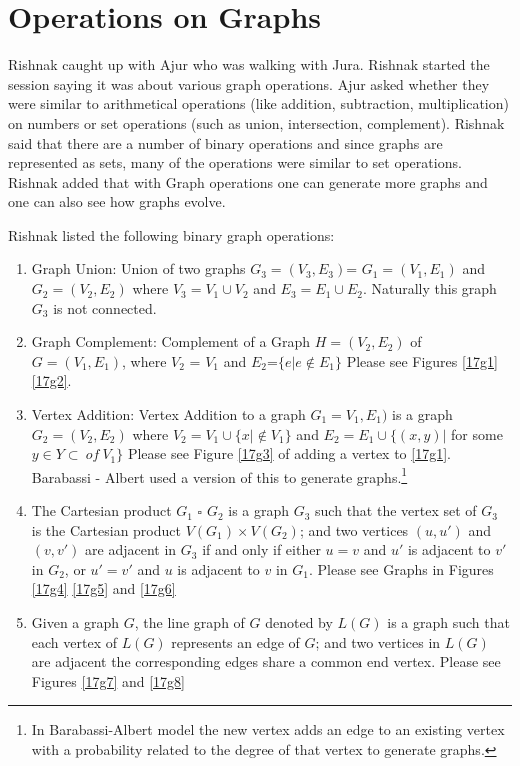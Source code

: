 \chapter{Operations on Graphs}

Rishnak caught up with Ajur who was walking with Jura. Rishnak started the session saying it was about various graph operations.
Ajur asked whether they were similar to arithmetical operations (like addition, subtraction, multiplication) on numbers or set operations (such as union, intersection, complement). Rishnak said that there are a number of binary operations and since graphs are represented as sets, many of the operations were similar to set operations. Rishnak added that with Graph operations one can generate more graphs and one can also see how graphs evolve.

Rishnak listed the following binary graph operations:
\begin{enumerate}
    \item Graph Union: Union of two graphs $G_3=(V_3,E_3)$= $G_1=(V_1,E_1)$ and $G_2=(V_2,E_2)$ where $V_3= V_1 \cup V_2$ and
    $E_3=E_1\cup E_2$. Naturally this graph $G_3$ is not connected.
    \item Graph Complement: Complement of a Graph $H=(V_2,E_2)$ of $G=(V_1,E_1)$, where $V_2$ = $V_1$ and $E_2$=$\{e| e \notin E_1\}$ Please see Figures \ref{17g1} \ref{17g2}.
    \item Vertex Addition: Vertex Addition to a graph $G_1=V_1,E_1)$ is a graph $G_2=(V_2,E_2)$  where $V_2=V_1 \cup \{x| \notin V_1\}$ and $E_2=E_1 \cup \{(x,y)  |$ for some  $y  \in Y \subset~ of~ V_1\}$ Please see Figure \ref{17g3} of adding a vertex to \ref{17g1}. Barabassi - Albert used a version of this to generate graphs.\footnote {In Barabassi-Albert model the new vertex adds an edge to an existing vertex with a probability related to the degree of that vertex to generate graphs.}
    \item  The Cartesian product $G_1$ $ \square $  $G_2$ is a graph $G_3$ such that
the vertex set of $G_3$  is the Cartesian product $V(G_1) × V(G_2)$; and
two vertices $(u,u' )$ and $(v,v' )$ are adjacent in $G_3$ if and only if either
$u = v$ and $u'$ is adjacent to $v'$ in $G_2$, or
$u' = v'$ and $u$ is adjacent to $v$ in $G_1$. Please see Graphs in Figures \ref{17g4} \ref{17g5} and \ref{17g6}
\item Given a graph $G$, the line graph  of $G$ denoted by $L(G)$ is a graph such that
each vertex of $L(G)$ represents an edge of $G$; and
two vertices in $L(G)$ are adjacent the corresponding edges share a common end vertex. Please see Figures \ref{17g7} and \ref{17g8}
\end{enumerate}
